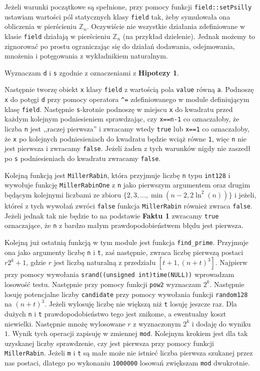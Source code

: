 \documentclass{article}
\begin{document}
Jeżeli warunki początkowe są spełnione, przy pomocy funkcji \texttt{field::setPsilly} ustawiam wartości pól statycznych klasy 
\texttt{field} tak, żeby symulowała
ona obliczenia w pierścieniu $\mathbb{Z}_n$. Oczywiście nie wszystkie działania zdefiniowane
w klasie \texttt{field} działają w pierścieniu $\mathbb{Z}_n$ (na przykład dzielenie). Jednak
możemy to zignorować po prostu ograniczając się do działań dodawania, odejmowania, mnożenia i potęgowania
z wykładnikiem naturalnym.

Wyznaczam \texttt{d} i \texttt{s} zgodnie z oznaczeniami z \textbf{Hipotezy 1}.

Następnie tworzę obiekt \texttt{x} klasy \texttt{field} z wartością pola \texttt{value} równą \texttt{a}.
Podnoszę \texttt{x} do potęgi \texttt{d} przy pomocy operatora \verb!^!\texttt{=} zdefiniowanego w module definiującym klasę \texttt{field}.
Następnie \texttt{s}-krotnie podnoszę w miejscu \texttt{x} do kwadratu przed każdym kolejnym podniesieniem sprawdzając, czy \texttt{x==n-1} 
co oznaczałoby, że liczba \texttt{n} jest ,,raczej pierwsza'' i zwracamy wtedy \texttt{true} lub \texttt{x==1} co oznaczałoby, że \texttt{x} po kolejnych podniesieniach do kwadratu
będzie wciąż równe \texttt{1}, więc \texttt{n} nie jest pierwsza i zwracamy \texttt{false}. Jeżeli żaden z tych warunków nigdy nie zaszedł 
po \texttt{s} podniesieniach do kwadratu zwracamy \texttt{false}.

Kolejną funkcją jest \texttt{MillerRabin}, która przyjmuje liczbę \texttt{n} typu \texttt{\texttt{\textunderscore \textunderscore int128}} i 
wywołuje funkcję \texttt{MillerRabinOne} z \texttt{n} jako pierwszym argumentem oraz drugim będącym kolejnymi liczbami ze zbioru
$\{2,3,...,\min(n-2, 2\ln^2(n))\}$ i jeżeli, któreś z tych wywołań zwróci \texttt{false} funkcja \texttt{MillerRabin} również 
zwraca \texttt{false}. Jeżeli jednak tak nie będzie to na podstawie \textbf{Faktu 1} zwracamy \texttt{true} oznaczające, że 
\texttt{n} z bardzo małym prawdopodobieństwem błędu jest pierwsza. 

Kolejną już ostatnią funkcją w tym module jest funkcja \texttt{find\_prime}. Przyjmuje ona jako argumenty liczbę \texttt{n} i 
\texttt{t}, zaś następnie, zwraca liczbę pierwszą postaci $r2^k+1$, gdzie $r$ jest liczbą naturalną z przedziału $[t+1,(n+t)^3]$.
Najpierw przy pomocy wywołania \texttt{srand((unsigned int)time(NULL))} wprowadzam losowość testu. 
Następnie przy pomocy funkcji \texttt{pow2} wyznaczam $2^k$. Następnie losuję potencjalne liczby \texttt{candidate} przy pomocy wywołania
funkcji \texttt{random128} na $(n+t)^3$. Jeżeli wylosuję liczbę nie większą niż \texttt{t} losuję jeszcze raz. Dla dużych \texttt{n} i \texttt{t}
prawdopodobieństwo tego jest znikome, a ewentualny koszt niewielki. Następnie mnożę
wylosowane $r$ z wyznaczonym $2^k$ i dodaję do wyniku $1$. Wynik tych operacji zapisuję w zmiennej \texttt{mod}.
Kolejnym krokiem jest dla tak uzyskanej liczby sprawdzenie, czy 
jest pierwsza przy pomocy funkcji \texttt{MillerRabin}. Jeżeli \texttt{m} i \texttt{t} są małe  może nie istnieć liczba pierwsza szukanej przez nas postaci, 
dlatego po wykonaniu \texttt{1000000} losowań zwiększam \texttt{mod} dwukrotnie.
\end{document}
